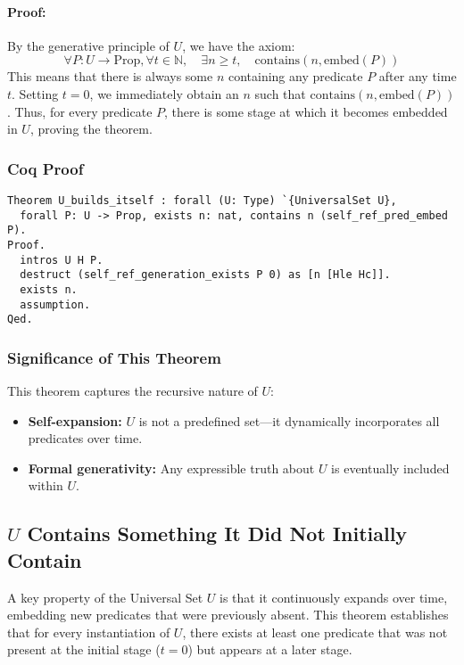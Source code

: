 \documentclass[12pt]{article}
\begin{document}
\paragraph{Proof:}

By the generative principle of \( U \), we have the axiom:
\[
\forall P: U \to \text{Prop}, \forall t \in \mathbb{N}, \quad \exists n \geq t, \quad \text{contains}(n, \text{embed}(P))
\]
This means that there is always some $n$ containing any predicate $P$ after any time $t$. Setting \( t = 0 \), we immediately obtain an \( n \) such that \( \text{contains}(n, \text{embed}(P)) \). Thus, for every predicate \( P \), there is some stage at which it becomes embedded in \( U \), proving the theorem.

\subsubsection{Coq Proof}

\begin{lstlisting}[language=Coq]
Theorem U_builds_itself : forall (U: Type) `{UniversalSet U},
  forall P: U -> Prop, exists n: nat, contains n (self_ref_pred_embed P).
Proof.
  intros U H P.
  destruct (self_ref_generation_exists P 0) as [n [Hle Hc]].
  exists n.
  assumption.
Qed.
\end{lstlisting}

\subsubsection{Significance of This Theorem}

This theorem captures the recursive nature of \( U \):

\begin{itemize}
    \item \textbf{Self-expansion:} \( U \) is not a predefined set—it dynamically incorporates all predicates over time.
    \item \textbf{Formal generativity:} Any expressible truth about \( U \) is eventually included within \( U \).
\end{itemize}


\subsection{\( U \) Contains Something It Did Not Initially Contain}

A key property of the Universal Set \( U \) is that it continuously expands over time, embedding new predicates that were previously absent. This theorem establishes that for every instantiation of \( U \), there exists at least one predicate that was not present at the initial stage (\( t = 0 \)) but appears at a later stage.
\end{document}
